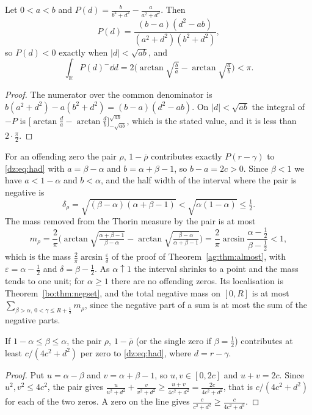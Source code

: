 \begin{lemma}\label{dz:lem:pair}
Let $0<a<b$ and $P(d)=\frac b{b^2+d^2}-\frac a{a^2+d^2}$. Then
\[
P(d)=\frac{(b-a)(d^2-ab)}{(a^2+d^2)(b^2+d^2)},
\]
so $P(d)<0$ exactly when $|d|<\sqrt{ab}$, and
\[
\int_{\mathbb R}P(d)^-\dd d=2\Big(\arctan\sqrt{\tfrac ba}-\arctan\sqrt{\tfrac ab}\Big)<\pi .
\]
\end{lemma}
\begin{proof}
The numerator over the common denominator is $b(a^2+d^2)-a(b^2+d^2)=(b-a)(d^2-ab)$. On $|d|<\sqrt{ab}$ the integral of $-P$ is $\big[\arctan\frac da-\arctan\frac db\big]_{-\sqrt{ab}}^{\sqrt{ab}}$, which is the stated value, and it is less than $2\cdot\frac\pi2$.
\end{proof}

For an offending zero the pair $\rho$, $1-\bar\rho$ contributes exactly $P(r-\gamma)$ to \eqref{dz:eq:had} with $a=\beta-\alpha$ and $b=\alpha+\beta-1$, so $b-a=2c>0$. Since $\beta<1$ we have $a<1-\alpha$ and $b<\alpha$, and the half width of the interval where the pair is negative is
\[
\delta_\rho=\sqrt{(\beta-\alpha)(\alpha+\beta-1)}<\sqrt{\alpha(1-\alpha)}\le\tfrac12 .
\]
The mass removed from the Thorin measure by the pair is at most
\[
m_\rho=\frac2\pi\Big(\arctan\sqrt{\tfrac{\alpha+\beta-1}{\beta-\alpha}}-\arctan\sqrt{\tfrac{\beta-\alpha}{\alpha+\beta-1}}\Big)=\frac2\pi\arcsin\frac{\alpha-\frac12}{\beta-\frac12}<1,
\]
which is the mass $\frac2\pi\arcsin\frac\varepsilon\delta$ of the proof of Theorem~\ref{ag:thm:almost}, with $\varepsilon=\alpha-\frac12$ and $\delta=\beta-\frac12$. As $\alpha\uparrow1$ the interval shrinks to a point and the mass tends to one unit; for $\alpha\ge1$ there are no offending zeros. Its localisation is Theorem~\ref{bo:thm:negset}, and the total negative mass on $[0,R]$ is at most $\sum_{\beta>\alpha,\,0<\gamma\le R+\frac12}m_\rho$, since the negative part of a sum is at most the sum of the negative parts.

\begin{lemma}\label{dz:lem:other}
If $1-\alpha\le\beta\le\alpha$, the pair $\rho$, $1-\bar\rho$ (or the single zero if $\beta=\frac12$) contributes at least $c/(4c^2+d^2)$ per zero to \eqref{dz:eq:had}, where $d=r-\gamma$.
\end{lemma}
\begin{proof}
Put $u=\alpha-\beta$ and $v=\alpha+\beta-1$, so $u,v\in[0,2c]$ and $u+v=2c$. Since $u^2,v^2\le4c^2$, the pair gives $\frac u{u^2+d^2}+\frac v{v^2+d^2}\ge\frac{u+v}{4c^2+d^2}=\frac{2c}{4c^2+d^2}$, that is $c/(4c^2+d^2)$ for each of the two zeros. A zero on the line gives $\frac c{c^2+d^2}\ge\frac c{4c^2+d^2}$.
\end{proof}

